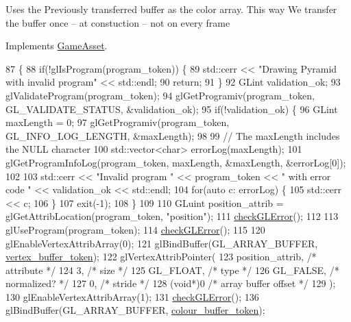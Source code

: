 Uses the Previously transferred buffer as the color array. This way We transfer the buffer once -- at constuction -- not on every frame

Implements \hyperlink{classGameAsset_a961aa51ca0a9961fc584c0b5d5431300}{Game\+Asset}.


\begin{DoxyCode}
87                                             \{
88   \textcolor{keywordflow}{if}(!glIsProgram(program\_token)) \{
89     std::cerr << \textcolor{stringliteral}{"Drawing Pyramid with invalid program"} << std::endl;
90     \textcolor{keywordflow}{return};
91   \}
92   GLint validation\_ok;
93   glValidateProgram(program\_token);
94   glGetProgramiv(program\_token, GL\_VALIDATE\_STATUS, &validation\_ok);
95   \textcolor{keywordflow}{if}(!validation\_ok) \{
96     GLint maxLength = 0;
97     glGetProgramiv(program\_token, GL\_INFO\_LOG\_LENGTH, &maxLength);
98 
99     \textcolor{comment}{// The maxLength includes the NULL character}
100     std::vector<char> errorLog(maxLength);
101     glGetProgramInfoLog(program\_token, maxLength, &maxLength, &errorLog[0]);
102 
103     std::cerr << \textcolor{stringliteral}{"Invalid program "} << program\_token << \textcolor{stringliteral}{" with error code "} << validation\_ok << std::endl;
104     \textcolor{keywordflow}{for}(\textcolor{keyword}{auto} c: errorLog) \{
105       std::cerr << c;
106     \}
107     exit(-1);
108   \}
109 
110   GLuint position\_attrib = glGetAttribLocation(program\_token, \textcolor{stringliteral}{"position"});
111   \hyperlink{PyramidAsset_8cc_a75f201b0e53e68726854997957322b8d}{checkGLError}();
112 
113   glUseProgram(program\_token);
114   \hyperlink{PyramidAsset_8cc_a75f201b0e53e68726854997957322b8d}{checkGLError}();
115 
120   glEnableVertexAttribArray(0);
121   glBindBuffer(GL\_ARRAY\_BUFFER, \hyperlink{classPyramidAsset_a54d9cec42bc77d07a66e6c1cd55049b0}{vertex\_buffer\_token});
122   glVertexAttribPointer(
123     position\_attrib,        \textcolor{comment}{/* attribute */}
124     3,        \textcolor{comment}{/* size */}
125     GL\_FLOAT,   \textcolor{comment}{/* type */}
126     GL\_FALSE,   \textcolor{comment}{/* normalized? */}
127     0,        \textcolor{comment}{/* stride */}
128     (\textcolor{keywordtype}{void}*)0    \textcolor{comment}{/* array buffer offset */}
129   );
130   glEnableVertexAttribArray(1);
131   \hyperlink{PyramidAsset_8cc_a75f201b0e53e68726854997957322b8d}{checkGLError}();
136   glBindBuffer(GL\_ARRAY\_BUFFER, \hyperlink{classPyramidAsset_a1c82b429f52d92feefacb5755017aec0}{colour\_buffer\_token});

\end{DoxyCode}
